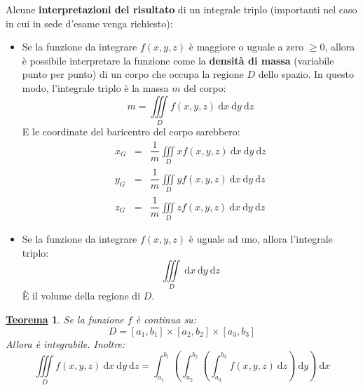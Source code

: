 \documentclass[a4paper]{article}
\newtheorem{theorem}{\textcolor{Red3}{\underline{Teorema}}}
\newcommand{\definition}[1]{\textcolor{Red3}{\textbf{#1}}}
\begin{document}
	\noindent
	Alcune \definition{interpretazioni del risultato} di un integrale triplo (importanti nel caso in cui in sede d'esame venga richiesto):
	\begin{itemize}
		\item Se la funzione da integrare $f\left(x,y,z\right)$ è maggiore o uguale a zero $\ge 0$, allora è possibile interpretare la funzione come la \textbf{densità di massa} (variabile punto per punto) di un corpo che occupa la regione $D$ dello spazio. In questo modo, l'integrale triplo è la massa $m$ del corpo:
		\begin{equation}\label{eq: densità di massa}
			m = \displaystyle\iiint\limits_{D} f\left(x,y,z\right) \:\mathrm{d}x\:\mathrm{d}y\:\mathrm{d}z
		\end{equation}
		E le coordinate del baricentro del corpo sarebbero:
		\begin{equation}\label{eq: coordinate del baricentro}
			\begin{array}{rcl}
				x_{G} &=& \dfrac{1}{m} \displaystyle\iiint\limits_{D} x f\left(x,y,z\right) \:\mathrm{d}x\:\mathrm{d}y\:\mathrm{d}z \\ [2em]
				y_{G} &=& \dfrac{1}{m} \displaystyle\iiint\limits_{D} y f\left(x,y,z\right) \:\mathrm{d}x\:\mathrm{d}y\:\mathrm{d}z \\ [2em]
				z_{G} &=& \dfrac{1}{m} \displaystyle\iiint\limits_{D} z f\left(x,y,z\right) \:\mathrm{d}x\:\mathrm{d}y\:\mathrm{d}z
			\end{array}
		\end{equation}

		\item Se la funzione da integrare $f\left(x,y,z\right)$ è uguale ad uno, allora l'integrale triplo:
		\begin{equation*}
			\displaystyle\iiint\limits_{D} \:\mathrm{d}x\:\mathrm{d}y\:\mathrm{d}z
		\end{equation*}
		È il volume della regione di $D$.
	\end{itemize}
	
	\begin{theorem}\label{theorem: integrali tripli}
		Se la funzione $f$ è continua su:
		\begin{equation*}
			D = \left[a_{1}, b_{1}\right] \times \left[a_{2}, b_{2}\right] \times \left[a_{3}, b_{3}\right]
		\end{equation*}
		Allora è integrabile. Inoltre:
		\begin{equation}
			\displaystyle\iiint\limits_{D} f\left(x,y,z\right) \:\mathrm{d}x\:\mathrm{d}y\:\mathrm{d}z 
			= 
			\displaystyle\int_{a_{1}}^{b_{1}} \left(\int_{a_{2}}^{b_{2}} \left(\int_{a_{3}}^{b_{3}} f\left(x,y,z\right) \:\mathrm{d}z\right) \: \mathrm{d}y\right) \:\mathrm{d}x
		\end{equation}
	\end{theorem}
\end{document}
